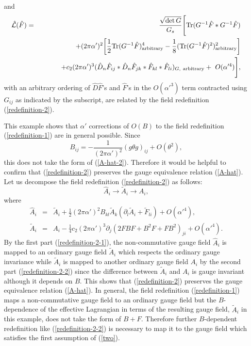 \documentclass[a4paper,12pt]{article}
\begin{document}
and
\begin{eqnarray}
\hat{{\cal L}}(\hat{F}) &=& \frac{\sqrt{\det G}}{G_s} \Biggl[
{\rm Tr} ( G^{-1} \hat{F} \ast G^{-1} \hat{F} )
\nonumber \\
&& \qquad \quad + (2 \pi \alpha')^2 \biggl[
\frac{1}{2} {\rm Tr} ( G^{-1} \hat{F} )^4_{\rm arbitrary}
-\frac{1}{8} ( {\rm Tr} ( G^{-1} \hat{F} )^2 )^2_{\rm arbitrary}
\biggr]
\nonumber \\
&& \qquad \quad + c_2 (2 \pi \alpha')^3
( \hat{D}_n \hat{F}_{ij} \ast \hat{D}_n \hat{F}_{jk}
\ast \hat{F}_{kl} \ast \hat{F}_{li} )_{G, \rm~arbitrary}
+ ~O(\alpha'^4)
\Biggr],
\end{eqnarray}
with an arbitrary ordering of $\hat{D} \hat{F}$'s and $\hat{F}$'s
in the $O(\alpha'^3)$ term contracted using $G_{ij}$
as indicated by the subscript,
are related by the field redefinition (\ref{redefinition-2}).

This example shows that
$\alpha'$ corrections of $O(B)$ to the field redefinition
(\ref{redefinition-1}) are in general possible.
Since
\begin{equation}
B_{ij} = -\frac{1}{(2 \pi \alpha')^2}
( g \theta g )_{ij} + O( \theta^2 ),
\end{equation}
this does not take the form of (\ref{A-hat-2}).
Therefore it would be helpful to confirm that (\ref{redefinition-2})
preserves the gauge equivalence relation (\ref{A-hat}).
Let us decompose the field redefinition (\ref{redefinition-2})
as follows:
\begin{equation}
\hat{A}_i \to \tilde{A}_i \to A_i,
\end{equation}
where
\begin{eqnarray}
\hat{A}_i &=& \tilde{A}_i + \frac{1}{2} (2 \pi \alpha')^2
B_{kl} \tilde{A}_k (\partial_l \tilde{A}_i + \tilde{F}_{li})
+ O(\alpha'^4),
\label{redefinition-2-1} \\
\tilde{A}_i &=& A_i 
-\frac{1}{4} c_2 (2 \pi \alpha')^3
\partial_j ( 2 F B F + B^2 F + F B^2 )_{ji}
+ O(\alpha'^4).
\label{redefinition-2-2}
\end{eqnarray}
By the first part (\ref{redefinition-2-1}),
the non-commutative gauge field $\hat{A}_i$ is mapped to
an ordinary gauge field $\tilde{A}_i$ which respects the ordinary
gauge invariance
while $\tilde{A}_i$ is mapped to another ordinary gauge field $A_i$
by the second part (\ref{redefinition-2-2})
since the difference between $\tilde{A}_i$ and $A_i$
is gauge invariant although it depends on $B$.
This shows that (\ref{redefinition-2})
preserves the gauge equivalence relation (\ref{A-hat}).
In general, the field redefinition (\ref{redefinition-1})
maps a non-commutative gauge field to an ordinary gauge field
but the $B$-dependence of the effective Lagrangian in terms of
the resulting gauge field, $\tilde{A}_i$ in this example,
does not take the form of $B+F$.
Therefore further $B$-dependent redefinition like
(\ref{redefinition-2-2})
is necessary to map it to the gauge field which satisfies
the first assumption of (\ref{two}).
\end{document}
